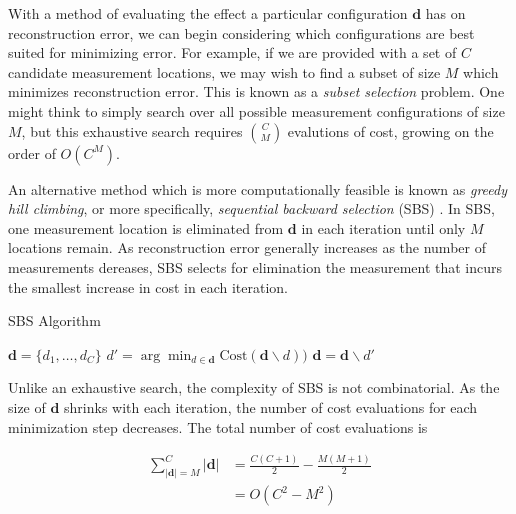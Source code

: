 \documentclass{article}
\begin{document}
With a method of evaluating the effect a particular configuration $\bm{d}$ has
on reconstruction error, we can begin considering which configurations are best
suited for minimizing error.  For example, if we are provided with a set of $C$
candidate measurement locations, we may wish to find a subset of size $M$ which
minimizes reconstruction error. This is known as a \emph{subset selection} problem.
One might think to simply search over all possible measurement configurations
of size $M$, but this exhaustive search requires $\binom{C}{M}$ evalutions of
cost, growing on the order of $O(C^M)$.

An alternative method which is more computationally feasible is known as
\emph{greedy hill climbing}, or more specifically, \emph{sequential backward
selection} (SBS) \cite{sharif}. In SBS, one measurement location is eliminated from $\bm{d}$ in each
iteration until only $M$ locations remain. As reconstruction error generally
increases as the number of measurements dereases, SBS selects for elimination the
measurement that incurs the smallest increase in cost in each iteration.

\begin{algorithm}
  \begin{algorithmic}
    \caption{SBS Algorithm}
    \State $\bm{d} = \{d_1, \dots, d_C\}$
    \Repeat
      \State $d' = \arg \min_{d \in \bm{d}} \text{Cost}(\bm{d} \backslash d))$
      \State $\bm{d} = \bm{d} \backslash d'$
  \end{algorithmic}
\end{algorithm}

Unlike an exhaustive search, the complexity of SBS is not combinatorial.  As the
size of $\bm{d}$ shrinks with each iteration, the number of cost evaluations for each
minimization step decreases.  The total number of cost evaluations is

$$
\begin{aligned}
  \sum_{|\bm{d}| = M}^C |\bm{d}|
  &= \frac{C
    (C + 1)}{2} - \frac{M(M + 1)}{2} \\
  &= O(C^2 - M^2)
\end{aligned}
$$
\end{document}
